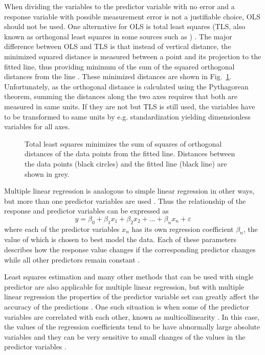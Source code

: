 \documentclass[english, twoside]{HYgradu}
\begin{document}
When dividing the variables to the predictor variable with no error and a response variable with possible measurement error is not a justifiable choice, OLS should not be used. One alternative for OLS is total least squares (TLS, also known as orthogonal least squares in some sources such as \citet{feigelson2012modern}) \citep{markovsky2007overview}.  The major difference between OLS and TLS is that instead of vertical distance, the minimized squared distance is measured between a point and its projection to the fitted line, thus providing minimum of the sum of the squared orthogonal distances from the line \citep{feigelson2012modern}. These minimized distances are shown in Fig.\ \ref{fig:TLS}. Unfortunately, as the orthogonal distance is calculated using the Pythagorean theorem, summing the distances along the two axes requires that both are measured in same units. If they are not but TLS is still used, the variables have to be transformed to same units by e.g. standardization yielding dimensionless variables for all axes.

\begin{figure}
    \centering
    
    \caption{Total least squares minimizes the sum of squares of orthogonal distances of the data points from the fitted line. Distances between the data points (black circles) and the fitted line (black line) are shown in grey.}\label{fig:TLS}
\end{figure}

Multiple linear regression is analogous to simple linear regression in other ways, but more than one predictor variables are used \citep{xin2009linear}. Thus the relationship of the response and predictor variables can be expressed as
\begin{equation}
	y = \beta_0 + \beta_1 x_1 + \beta_2 x_2 + \dots + \beta_n x_n + \varepsilon
\end{equation}
where each of the predictor variables $x_n$ has its own regression coefficient $\beta_n$, the value of which is chosen to best model the data. Each of these parameters describes how the response value changes if the corresponding predictor changes while all other predictors remain constant \citep{montgomery2012introduction}.

Least squares estimation and many other methods that can be used with single predictor are also applicable for multiple linear regression, but with multiple linear regression the properties of the predictor variable set can greatly affect the accuracy of the predictions \citep{montgomery2012introduction}. One such situation is when some of the predictor variables are correlated with each other, known as multicollinearity \citep{montgomery2012introduction}. In this case, the values of the regression coefficients tend to be have abnormally large absolute variables and they can be very sensitive to small changes of the values in the predictor variables \citep{montgomery2012introduction}.
\end{document}
